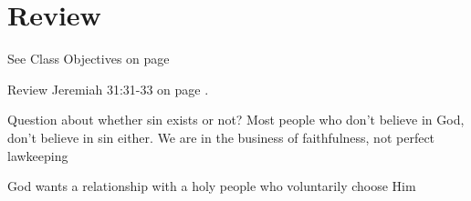 \chapter{Review}

\begin{goals}
\goal See Class Objectives on page \pageref{sec:ClassObjectives}
\end{goals}
\begin{bible}
Review Jeremiah 31:31-33 on page \pageref{sec:KeyPassage}.
\end{bible}

\begin{discussion}
Question about whether sin exists or not? Most people who don't believe in God, don't believe in sin either.
We are in the business of faithfulness, not perfect lawkeeping

God wants a relationship with a holy people who voluntarily choose Him




\end{discussion}